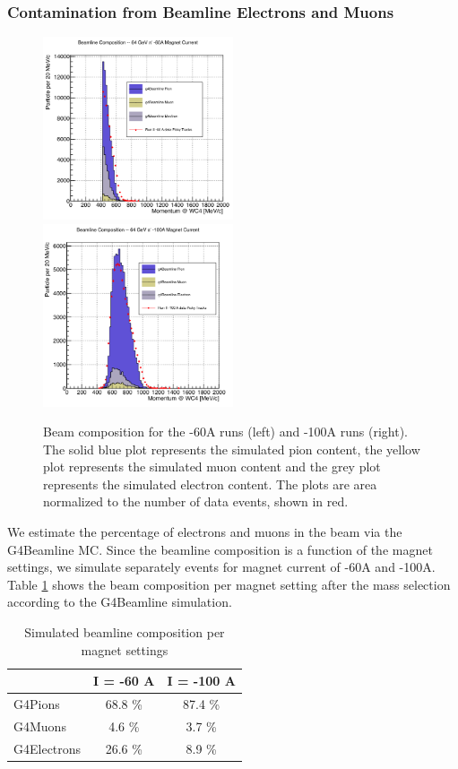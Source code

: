 \subsubsection{Contamination from Beamline Electrons and Muons}\label{stionEMu}
\begin{figure}[b]
\includegraphics[width=0.5\textwidth,height=\textheight,keepaspectratio]{Studies/Figures//Beam60A.png}
\includegraphics[width=0.5\textwidth,height=\textheight,keepaspectratio]{Studies/Figures//Beam100A.png}
\caption{Beam composition for the -60A runs (left) and -100A runs (right). The solid blue plot represents the simulated pion content, the yellow plot represents the simulated muon content and the grey plot represents the simulated electron content. The plots are area normalized to the number of data events, shown in red. }
\label{fig:BeamComposition}
\end{figure}

We estimate the percentage of electrons and muons in the beam via the G4Beamline MC. 
Since the beamline composition is a function of the magnet settings, we simulate separately events for magnet current of -60A and -100A. 
Table \ref{tab:beamline} shows the beam composition per magnet setting after the mass selection according to the G4Beamline simulation.
\begin{table}[p]
\centering
\begin{tabular}{|l|c|c|}
\hline
                     & I = -60 A           & I = -100 A \\ \hline
G4Pions       &   68.8 \%           &      87.4 \%        \\ \hline
G4Muons     &     4.6 \%           &        3.7 \%         \\ \hline
G4Electrons &   26.6 \%           &        8.9 \%        \\ \hline
\end{tabular}
\caption{Simulated beamline composition per magnet settings}
\label{tab:beamline}
\end{table}


